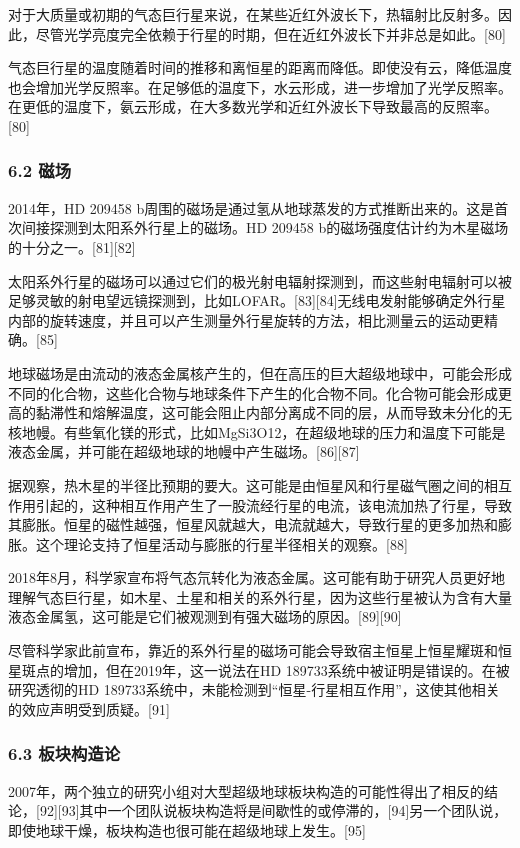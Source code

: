 对于大质量或初期的气态巨行星来说，在某些近红外波长下，热辐射比反射多。因此，尽管光学亮度完全依赖于行星的时期，但在近红外波长下并非总是如此。[80]

气态巨行星的温度随着时间的推移和离恒星的距离而降低。即使没有云，降低温度也会增加光学反照率。在足够低的温度下，水云形成，进一步增加了光学反照率。在更低的温度下，氨云形成，在大多数光学和近红外波长下导致最高的反照率。[80]
\subsubsection{6.2 磁场}
2014年，HD 209458 b周围的磁场是通过氢从地球蒸发的方式推断出来的。这是首次间接探测到太阳系外行星上的磁场。HD 209458 b的磁场强度估计约为木星磁场的十分之一。[81][82]

太阳系外行星的磁场可以通过它们的极光射电辐射探测到，而这些射电辐射可以被足够灵敏的射电望远镜探测到，比如LOFAR。[83][84]无线电发射能够确定外行星内部的旋转速度，并且可以产生测量外行星旋转的方法，相比测量云的运动更精确。[85]

地球磁场是由流动的液态金属核产生的，但在高压的巨大超级地球中，可能会形成不同的化合物，这些化合物与地球条件下产生的化合物不同。化合物可能会形成更高的黏滞性和熔解温度，这可能会阻止内部分离成不同的层，从而导致未分化的无核地幔。有些氧化镁的形式，比如MgSi3O12，在超级地球的压力和温度下可能是液态金属，并可能在超级地球的地幔中产生磁场。[86][87]

据观察，热木星的半径比预期的要大。这可能是由恒星风和行星磁气圈之间的相互作用引起的，这种相互作用产生了一股流经行星的电流，该电流加热了行星，导致其膨胀。恒星的磁性越强，恒星风就越大，电流就越大，导致行星的更多加热和膨胀。这个理论支持了恒星活动与膨胀的行星半径相关的观察。[88]

2018年8月，科学家宣布将气态氘转化为液态金属。这可能有助于研究人员更好地理解气态巨行星，如木星、土星和相关的系外行星，因为这些行星被认为含有大量液态金属氢，这可能是它们被观测到有强大磁场的原因。[89][90]

尽管科学家此前宣布，靠近的系外行星的磁场可能会导致宿主恒星上恒星耀斑和恒星斑点的增加，但在2019年，这一说法在HD 189733系统中被证明是错误的。在被研究透彻的HD 189733系统中，未能检测到“恒星-行星相互作用”，这使其他相关的效应声明受到质疑。[91]
\subsubsection{6.3 板块构造论}
2007年，两个独立的研究小组对大型超级地球板块构造的可能性得出了相反的结论，[92][93]其中一个团队说板块构造将是间歇性的或停滞的，[94]另一个团队说，即使地球干燥，板块构造也很可能在超级地球上发生。[95]


